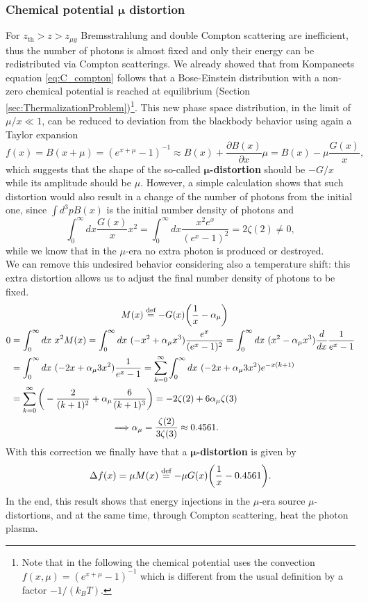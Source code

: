 \subsubsection{Chemical potential $\boldsymbol\mu$ distortion}
For $z_\text{th}>z>z_{\mu y}$ Bremsstrahlung and double Compton scattering are inefficient, thus the number of photons is almost fixed and only their energy can be redistributed via Compton scatterings. We already showed that from Kompaneets equation \eqref{eq:C_compton} follows that a Bose-Einstein distribution with a non-zero chemical potential is reached at equilibrium (Section \ref{sec:ThermalizationProblem})\footnote{Note that in the following the chemical potential uses the convection $f(x,\mu)=(e^{x+\mu}-1)^{-1}$ which is different from the usual definition by a factor $-1/(k_BT)$.}. This new phase space distribution, in the limit of $\mu/x\ll1$, can be reduced to deviation from the blackbody behavior using again a Taylor expansion
$$f(x)=B(x+\mu)=(e^{x+\mu}-1)^{-1}\approx B(x)+\frac{\partial B(x)}{\partial x}\mu=B(x)-\mu\frac{G(x)}{x},$$
which suggests that the shape of the so-called $\boldsymbol\mu$\textbf{-distortion} should be $-G/x$ while its amplitude should be $\mu$. However, a simple calculation shows that such distortion would also result in a change of the number of photons from the initial one, since $\int d^3p B(x)$ is the initial number density of photons and
$$\int_0^\infty dx \frac{G(x)}{x}x^2=\int_0^\infty dx \frac{x^2e^x}{(e^x-1)^2}=2\zeta(2)\neq0,$$
while we know that in the $\mu$-era no extra photon is produced or destroyed.\\ 
We can remove this undesired behavior considering also a temperature shift: this extra distortion allows us to adjust the final number density of photons to be fixed.
\begin{align}
    \label{eq:SD_mu}
    &\qquad\qquad\qquad\qquad\qquad\qquad M(x)\defeq-G(x)\bigg(\frac{1}{x}-\alpha_\mu\bigg)\\
    0&=\int_0^\infty dx\ x^2M(x)=\int_0^\infty dx\ (-x^2+\alpha_\mu x^3)\frac{e^x}{(e^x-1)^2}=\int_0^\infty dx\ (x^2-\alpha_\mu x^3)\frac{d}{dx}\frac{1}{e^x-1}\nonumber\\&=\int_0^\infty dx\ (-2x+\alpha_\mu 3x^2)\frac{1}{e^x-1}=\sum_{k=0}^{\infty}\int_0^\infty dx\ (-2x+\alpha_\mu 3x^2)e^{-x(k+1)}\nonumber\\&=\sum_{k=0}^{\infty}\bigg(-\frac{2}{(k+1)^2}+\alpha_\mu\frac{6}{(k+1)^3}\bigg)=-2\zeta(2)+6\alpha_\mu\zeta(3)\nonumber\\
    &\qquad\qquad\qquad\quad\qquad\qquad\Longrightarrow\alpha_\mu=\frac{\zeta(2)}{3\zeta(3)}\approx0.4561.\nonumber
\end{align}
With this correction we finally have that a $\boldsymbol\mu$\textbf{-distortion} is given by$$\Delta f(x)=\mu M(x)\stackrel{\text{def}}{=}-\mu G(x)\bigg(\frac{1}{x}-0.4561\bigg).$$
In the end, this result shows that energy injections in the $\mu$-era source $\mu$-distortions, and at the same time, through Compton scattering, heat the photon plasma.

